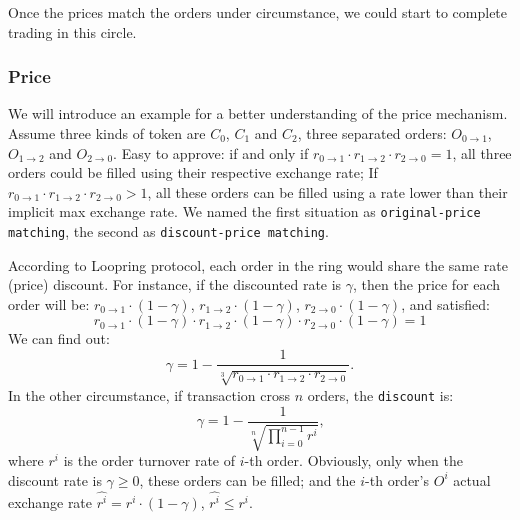 \documentclass[UTF8,nofonts]{article}
\begin{document}
Once the prices match the orders under circumstance, we could start to complete trading in this circle.

\subsubsection{Price\label{sec: matchprice}}
We will introduce an example for a better understanding of the price mechanism. Assume three kinds of token are $C_{0}$, $C_{1}$ and $C_{2}$, three separated orders: $O_{0\rightarrow 1}$, $O_{1 \rightarrow 2}$ and $O_{2 \rightarrow 0}$. Easy to approve: if and only if $r_{0 \rightarrow 1} \cdot r_{1 \rightarrow 2}\cdot r_{2 \rightarrow 0} = 1$,  all three orders could be filled using their respective exchange rate; If $r_{0 \rightarrow 1} \cdot r_{1 \rightarrow 2}\cdot r_{2 \rightarrow 0} > 1$, all these orders can be filled using a rate lower than their implicit max exchange rate. We named the first situation as \texttt{original-price matching}, the second as \texttt{discount-price matching}.

According to Loopring protocol, each order in the ring would share the same rate (price) discount. For instance, if the discounted rate is $\gamma$, then the price for each order will be:
$r_{0\rightarrow 1} \cdot (1-\gamma)$, $r_{1\rightarrow 2} \cdot (1-\gamma)$, $r_{2 \rightarrow 0} \cdot (1-\gamma)$, and satisfied: 
\begin{equation}
r_{0\rightarrow 1} \cdot (1-\gamma)\cdot r_{1\rightarrow 2} \cdot (1-\gamma) \cdot r_{2 \rightarrow 0} \cdot (1-\gamma) = 1
\end{equation}
We can find out: 
\begin{equation*}
\gamma = 1- \frac{1}{\sqrt[3]{r_{0\rightarrow 1} \cdot r_{1\rightarrow 2} \cdot r_{2\rightarrow 0}}}\text{.}
\end{equation*}
In the other circumstance, if transaction cross $n$ orders, the \texttt{discount} is: 
\begin{equation*}
\gamma = 1- \frac{1}{\sqrt[n]{\prod_{i=0}^{n-1} r^i}} \text{,}
\end{equation*}
where $r^i$ is the order turnover rate of $i$-th order. Obviously, only when the discount rate is $\gamma \ge 0$, these orders can be filled; and the $i$-th order's $O^i$ actual exchange rate $\hat{r^i} = r^i \cdot (1-\gamma)$, $\hat{r^i}\le r^i$.

\end{document}
